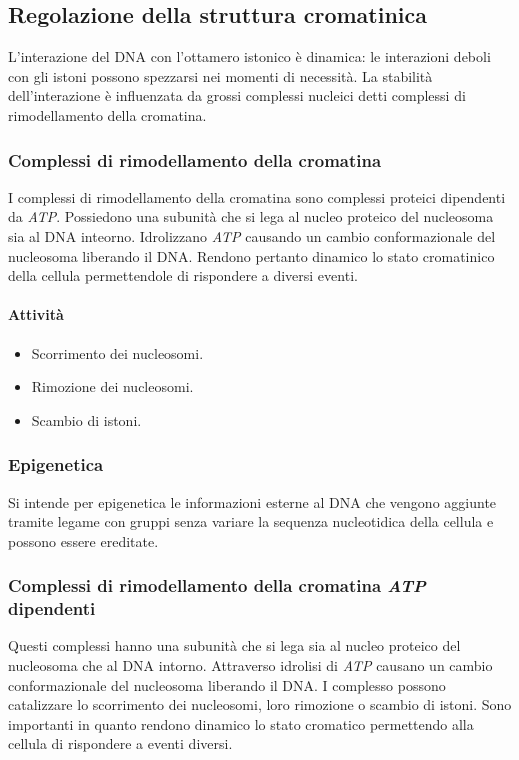 	\subsection{Regolazione della struttura cromatinica}
	L'interazione del DNA con l'ottamero istonico \`e dinamica: le interazioni deboli con gli istoni possono spezzarsi nei momenti di necessit\`a.
	La stabilit\`a dell'interazione \`e influenzata da grossi complessi nucleici detti complessi di rimodellamento  della cromatina.

		\subsubsection{Complessi di rimodellamento della cromatina}
		I complessi di rimodellamento della cromatina sono complessi proteici dipendenti da \emph{ATP}.
		Possiedono una subunit\`a che si lega al nucleo proteico del nucleosoma sia al DNA inteorno.
		Idrolizzano \emph{ATP} causando un cambio conformazionale del nucleosoma liberando il DNA.
		Rendono pertanto dinamico lo stato cromatinico della cellula permettendole di rispondere a diversi eventi.
		
			\paragraph{Attivit\`a}
			\begin{multicols}{2}
				\begin{itemize}
					\item Scorrimento dei nucleosomi.
					\item Rimozione dei nucleosomi.
					\item Scambio di istoni.
				\end{itemize}
			\end{multicols}


		\subsubsection{Epigenetica}
		Si intende per epigenetica le informazioni esterne al DNA che vengono aggiunte tramite legame con gruppi senza variare la sequenza nucleotidica della cellula e possono essere ereditate.

		\subsubsection{Complessi di rimodellamento della cromatina \emph{ATP} dipendenti}
		Questi complessi hanno una subunit\`a che si lega sia al nucleo proteico del nucleosoma che al DNA intorno.
		Attraverso idrolisi di \emph{ATP} causano un cambio conformazionale del nucleosoma liberando il DNA.
		I complesso possono catalizzare lo scorrimento dei nucleosomi, loro rimozione o scambio di istoni.
		Sono importanti in quanto rendono dinamico lo stato cromatico permettendo alla cellula di rispondere a eventi diversi.


